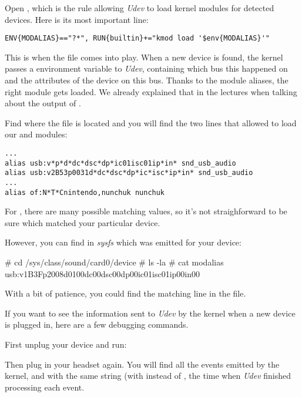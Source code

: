 Open , which is the rule allowing {\em Udev}
to load kernel modules for detected devices. Here is its most important
line:

\begin{verbatim}
ENV{MODALIAS}=="?*", RUN{builtin}+="kmod load '$env{MODALIAS}'"
\end{verbatim}

This is when the  file comes into play.
When a new device is found, the kernel passes a 
environment variable to {\em Udev}, containing which bus this
happened on and the attributes of the device on this bus.
Thanks to the module aliases, the right module gets loaded.
We already explained that in the lectures when talking about
the output of .

Find where the  file is located and
you will find the two lines that allowed to load our
 and  modules:

\begin{verbatim}
...
alias usb:v*p*d*dc*dsc*dp*ic01isc01ip*in* snd_usb_audio
alias usb:v2B53p0031d*dc*dsc*dp*ic*isc*ip*in* snd_usb_audio
...
alias of:N*T*Cnintendo,nunchuk nunchuk

\end{verbatim}

For , there are many possible matching values,
so it's not straighforward to be sure which matched your particular
device.

However, you can find in {\em sysfs} which 
was emitted for your device:

\begin{bashinput}
# cd /sys/class/sound/card0/device
# ls -la
# cat modalias
usb:v1B3Fp2008d0100dc00dsc00dp00ic01isc01ip00in00
\end{bashinput}

With a bit of patience, you could find the matching line in the
 file.

If you want to see the information sent to {\em Udev} by the
kernel when a new device is plugged in, here are a few debugging
commands.

First unplug your device and run:


Then plug in your headset again. You will find all the events emitted
by the kernel, and with the same string (with  instead of
, the time when {\em Udev} finished processing each event.

